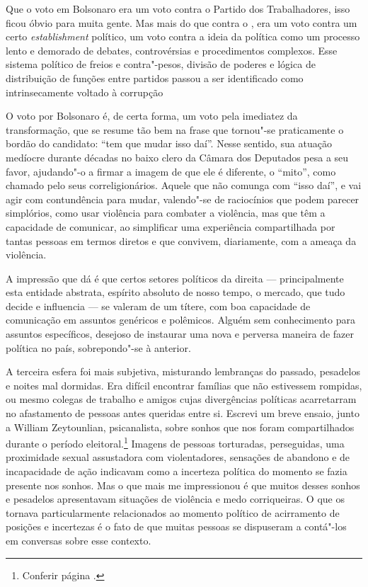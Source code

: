 Que o voto em Bolsonaro era um voto contra o Partido dos Trabalhadores,
isso ficou óbvio para muita gente.
Mas mais do que contra o , era um voto contra um
certo \emph{establishment} político, um voto contra a ideia da política
como um processo lento e demorado de debates, controvérsias e
procedimentos complexos. Esse sistema político de freios e contra"-pesos, divisão de poderes e lógica de distribuição de funções entre partidos passou a ser identificado como intrinsecamente voltado à corrupção

O voto por Bolsonaro é, de certa forma, um voto
pela imediatez da transformação, que se resume tão bem na frase que
tornou"-se praticamente o bordão do candidato: ``tem que mudar isso
daí''. Nesse sentido, sua atuação medíocre durante décadas no baixo
clero da Câmara dos Deputados pesa a seu favor, ajudando"-o a firmar a imagem de que
ele é diferente, o ``mito'', como chamado pelo seus correligionários.
Aquele que não comunga com ``isso daí'', e vai agir com contundência para
mudar, valendo"-se de raciocínios que podem parecer simplórios, como usar
violência para combater a violência, mas que têm a capacidade de
comunicar, ao simplificar uma experiência compartilhada por tantas
pessoas em termos diretos e que convivem, diariamente, com a ameaça da violência.

A impressão que dá é que certos setores
políticos da direita --- principalmente esta entidade abstrata, espírito absoluto de nosso tempo, o mercado, que tudo decide e influencia --- se valeram de um títere, com boa capacidade de
comunicação em assuntos genéricos e polêmicos. Alguém sem conhecimento
para assuntos específicos, desejoso de instaurar uma nova e perversa maneira de fazer política no país, sobrepondo"-se à anterior.

A terceira esfera foi mais subjetiva, misturando lembranças do passado,
pesadelos e noites mal dormidas. Era difícil encontrar famílias que não
estivessem rompidas, ou mesmo colegas de trabalho e amigos cujas divergências
políticas acarretarram no afastamento de pessoas antes queridas entre si.
Escrevi um breve ensaio, junto a William Zeytounlian, psicanalista, sobre sonhos
que nos foram compartilhados durante o período eleitoral.\footnote{Conferir página \pageref{sonhos}.} Imagens de
pessoas torturadas, perseguidas, uma proximidade sexual assustadora com
violentadores, sensações de abandono e de incapacidade de ação indicavam
como a incerteza política do momento se fazia presente nos sonhos. Mas o
que mais me impressionou é que muitos desses sonhos e pesadelos
apresentavam situações de violência e medo corriqueiras. O que os
tornava particularmente relacionados ao momento político de acirramento
de posições e incertezas é o fato de que muitas pessoas se dispuseram a
contá"-los em conversas sobre esse contexto.

